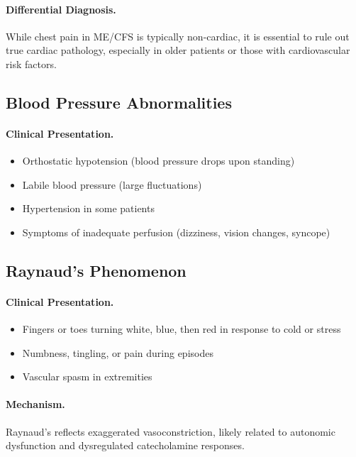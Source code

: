 \paragraph{Differential Diagnosis.}
While chest pain in ME/CFS is typically non-cardiac, it is essential to rule out true cardiac pathology, especially in older patients or those with cardiovascular risk factors.

\subsection{Blood Pressure Abnormalities}
\label{subsec:blood-pressure}

\paragraph{Clinical Presentation.}
\begin{itemize}
    \item Orthostatic hypotension (blood pressure drops upon standing)
    \item Labile blood pressure (large fluctuations)
    \item Hypertension in some patients
    \item Symptoms of inadequate perfusion (dizziness, vision changes, syncope)
\end{itemize}

\subsection{Raynaud's Phenomenon}
\label{subsec:raynauds}

\paragraph{Clinical Presentation.}
\begin{itemize}
    \item Fingers or toes turning white, blue, then red in response to cold or stress
    \item Numbness, tingling, or pain during episodes
    \item Vascular spasm in extremities
\end{itemize}

\paragraph{Mechanism.}
Raynaud's reflects exaggerated vasoconstriction, likely related to autonomic dysfunction and dysregulated catecholamine responses.

